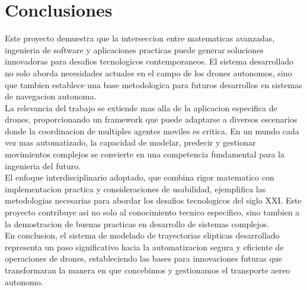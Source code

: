 \documentclass[12pt,a4paper]{article}
\begin{document}
\section{Conclusiones}

Este proyecto demuestra que la interseccion entre matematicas avanzadas, ingenieria de software y aplicaciones practicas puede generar soluciones innovadoras para desafios tecnologicos contemporaneos. El sistema desarrollado no solo aborda necesidades actuales en el campo de los drones autonomos, sino que tambien establece una base metodologica para futuros desarrollos en sistemas de navegacion autonoma.\\

La relevancia del trabajo se extiende mas alla de la aplicacion especifica de drones, proporcionando un framework que puede adaptarse a diversos escenarios donde la coordinacion de multiples agentes moviles es critica. En un mundo cada vez mas automatizado, la capacidad de modelar, predecir y gestionar movimientos complejos se convierte en una competencia fundamental para la ingenieria del futuro.\\

El enfoque interdisciplinario adoptado, que combina rigor matematico con implementacion practica y consideraciones de usabilidad, ejemplifica las metodologias necesarias para abordar los desafios tecnologicos del siglo XXI. Este proyecto contribuye asi no solo al conocimiento tecnico especifico, sino tambien a la demostracion de buenas practicas en desarrollo de sistemas complejos.\\

En conclusion, el sistema de modelado de trayectorias elipticas desarrollado representa un paso significativo hacia la automatizacion segura y eficiente de operaciones de drones, estableciendo las bases para innovaciones futuras que transformaran la manera en que concebimos y gestionamos el transporte aereo autonomo.
\end{document}
